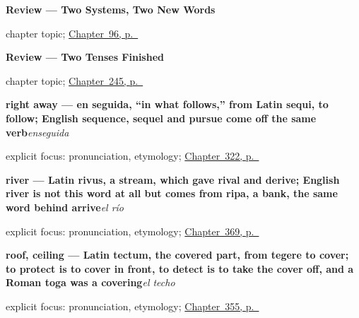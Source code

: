 \noindent\begin{minipage}[t]{\linewidth}
\raggedright
\textbf{Review --- Two Systems, Two New Words}\par
\footnotesize chapter topic; \hyperref[ch:review-both-objects]{Chapter~96, p.~\pageref*{ch:review-both-objects}}
\end{minipage}\par\smallskip

\noindent\begin{minipage}[t]{\linewidth}
\raggedright
\textbf{Review --- Two Tenses Finished}\par
\footnotesize chapter topic; \hyperref[ch:repaso-paradigmas]{Chapter~245, p.~\pageref*{ch:repaso-paradigmas}}
\end{minipage}\par\smallskip

\noindent\begin{minipage}[t]{\linewidth}
\raggedright
\textbf{right away — en seguida, \textquotedblleft{}in what follows,\textquotedblright{} from Latin sequi, to follow; English sequence, sequel and pursue come off the same verb}\enspace\emph{enseguida}\par
\footnotesize explicit focus: pronunciation, etymology; \hyperref[ch:anoche-y-todavia]{Chapter~322, p.~\pageref*{ch:anoche-y-todavia}}
\end{minipage}\par\smallskip

\noindent\begin{minipage}[t]{\linewidth}
\raggedright
\textbf{river — Latin rivus, a stream, which gave rival and derive; English river is not this word at all but comes from ripa, a bank, the same word behind arrive}\enspace\emph{el río}\par
\footnotesize explicit focus: pronunciation, etymology; \hyperref[ch:el-rio-y-la-arena]{Chapter~369, p.~\pageref*{ch:el-rio-y-la-arena}}
\end{minipage}\par\smallskip

\noindent\begin{minipage}[t]{\linewidth}
\raggedright
\textbf{roof, ceiling — Latin tectum, the covered part, from tegere to cover; to protect is to cover in front, to detect is to take the cover off, and a Roman toga was a covering}\enspace\emph{el techo}\par
\footnotesize explicit focus: pronunciation, etymology; \hyperref[ch:la-pared-y-el-techo]{Chapter~355, p.~\pageref*{ch:la-pared-y-el-techo}}
\end{minipage}\par\smallskip

